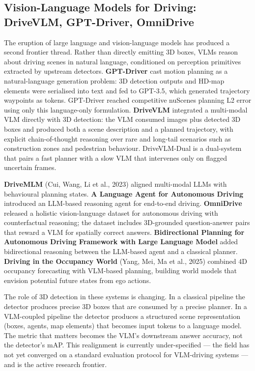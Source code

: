 \documentclass{article}
\begin{document}
\subsection{Vision-Language Models for Driving: DriveVLM, GPT-Driver, OmniDrive}\label{vision-language-models-for-driving-drivevlm-gpt-driver-omnidrive}

The eruption of large language and vision-language models has produced a second frontier thread. Rather than directly emitting 3D boxes, VLMs reason about driving scenes in natural language, conditioned on perception primitives extracted by upstream detectors. \textbf{GPT-Driver} \citep{mao20233dobjectdetectionf} cast motion planning as a natural-language generation problem: 3D detection outputs and HD-map elements were serialised into text and fed to GPT-3.5, which generated trajectory waypoints as tokens. GPT-Driver reached competitive nuScenes planning L2 error using only this language-only formulation. \textbf{DriveVLM} \citep{tian2024drivevlmtheconverg} integrated a multi-modal VLM directly with 3D detection: the VLM consumed images plus detected 3D boxes and produced both a scene description and a planned trajectory, with explicit chain-of-thought reasoning over rare and long-tail scenarios such as construction zones and pedestrian behaviour. DriveVLM-Dual is a dual-system that pairs a fast planner with a slow VLM that intervenes only on flagged uncertain frames.

\textbf{DriveMLM} (Cui, Wang, Li et al., 2023) aligned multi-modal LLMs with behavioural planning states. \textbf{A Language Agent for Autonomous Driving} \citep{mao20233dobjectdetectionf} introduced an LLM-based reasoning agent for end-to-end driving. \textbf{OmniDrive} \citep{wang2024omnidriveaholistic} released a holistic vision-language dataset for autonomous driving with counterfactual reasoning; the dataset includes 3D-grounded question-answer pairs that reward a VLM for spatially correct answers. \textbf{Bidirectional Planning for Autonomous Driving Framework with Large Language Model} \citep{ma20233dobjectdetectionf} added bidirectional reasoning between the LLM-based agent and a classical planner. \textbf{Driving in the Occupancy World} (Yang, Mei, Ma et al., 2025) combined 4D occupancy forecasting with VLM-based planning, building world models that envision potential future states from ego actions.

The role of 3D detection in these systems is changing. In a classical pipeline the detector produces precise 3D boxes that are consumed by a precise planner. In a VLM-coupled pipeline the detector produces a structured scene representation (boxes, agents, map elements) that becomes input tokens to a language model. The metric that matters becomes the VLM's downstream answer accuracy, not the detector's mAP. This realignment is currently under-specified --- the field has not yet converged on a standard evaluation protocol for VLM-driving systems --- and is the active research frontier.
\end{document}
